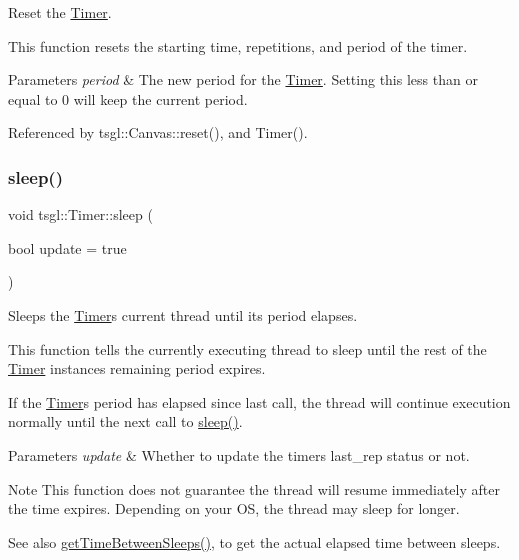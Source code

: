 Reset the \hyperlink{classtsgl_1_1_timer}{Timer}. 

This function resets the starting time, repetitions, and period of the timer. 
\begin{DoxyParams}{Parameters}
{\em period} & The new period for the \hyperlink{classtsgl_1_1_timer}{Timer}. Setting this less than or equal to 0 will keep the current period. \\
\hline
\end{DoxyParams}


Referenced by tsgl\+::\+Canvas\+::reset(), and Timer().

\mbox{\label{classtsgl_1_1_timer_a5c6e0dca6793d48c675e05b983da7f07}} 
\subsubsection{\texorpdfstring{sleep()}{sleep()}}
{\footnotesize\ttfamily void tsgl\+::\+Timer\+::sleep (\begin{DoxyParamCaption}\item[{bool}]{update = {\ttfamily true} }\end{DoxyParamCaption})}



Sleeps the \hyperlink{classtsgl_1_1_timer}{Timer}\textquotesingle{}s current thread until its period elapses. 

This function tells the currently executing thread to sleep until the rest of the \hyperlink{classtsgl_1_1_timer}{Timer} instance\textquotesingle{}s remaining period expires.

If the \hyperlink{classtsgl_1_1_timer}{Timer}\textquotesingle{}s period has elapsed since last call, the thread will continue execution normally until the next call to \hyperlink{classtsgl_1_1_timer_a5c6e0dca6793d48c675e05b983da7f07}{sleep()}. 
\begin{DoxyParams}{Parameters}
{\em update} & Whether to update the timer\textquotesingle{}s last\+\_\+rep status or not. \\
\hline
\end{DoxyParams}
\begin{DoxyNote}{Note}
This function does not guarantee the thread will resume immediately after the time expires. Depending on your OS, the thread may sleep for longer. 
\end{DoxyNote}
\begin{DoxySeeAlso}{See also}
\hyperlink{classtsgl_1_1_timer_a1ade9f9a03047e2604622bf4ae16347b}{get\+Time\+Between\+Sleeps()}, to get the actual elapsed time between sleeps. 
\end{DoxySeeAlso}


